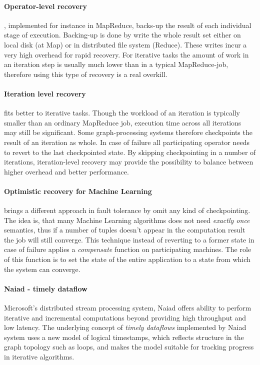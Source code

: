 \paragraph{Operator-level recovery}, implemented for instance in MapReduce\cite{mapreduce}, backs-up the result of each individual stage of execution. Backing-up is done by write the whole result set either on local disk (at Map) or in distributed file system (Reduce). These writes incur a very high overhead for rapid recovery. For iterative tasks the amount of work in an iteration step is usually  much lower than in a typical MapReduce-job, therefore using this type of recovery is a real overkill.

\paragraph{Iteration level recovery} fits better to iterative tasks. Though the workload of an iteration is typically smaller than an ordinary MapReduce job, execution time across all iterations  may still be significant. Some graph-processing systems\cite{distgraphlab}\cite{pregel} therefore checkpoints the result of an iteration as whole. In case of failure all participating operator needs to revert to the last checkpointed state. By skipping checkpointing in a number of iterations, iteration-level recovery may provide the possibility to balance between higher overhead and better performance.

\paragraph{Optimistic recovery for Machine Learning}\cite{allroadleadtorome} brings a different approach in fault tolerance by omit any kind of checkpointing. The idea is, that many Machine Learning algorithms does not need \textit{exactly once} semantics, thus if a number of tuples doesn't appear in the computation result the job will still converge.  This technique instead of reverting to a former state in case of failure applies a \textit{compensate} function on participating machines. The role of this function is to set the state of the entire application to a state from which the system can converge.





\paragraph{Naiad - timely dataflow}
Microsoft's  distributed stream processing system, Naiad\cite{naiad} offers ability to perform iterative and incremental computations beyond providing high throughput and low latency.
The underlying concept of \textit{timely dataflows} implemented by Naiad system uses a new model of logical timestamps, which reflects structure in the graph topology such as loops, and makes the model suitable  for tracking progress in iterative algorithms. 

